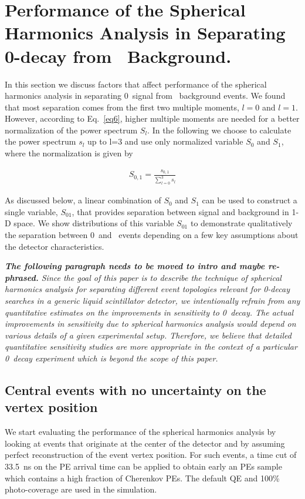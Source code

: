 \section{Performance of the Spherical Harmonics Analysis in Separating 0\nbb-decay from \B~Background.}
\label{sec:performance}

In this section we discuss factors that affect performance of the spherical harmonics analysis in separating
0\nbb~signal from \B~background events. We found that most separation comes from the first two multiple moments,
$l=0$ and $l=1$. However, according to Eq.~\ref{eq6}, higher multiple moments are needed for a better normalization of the 
power spectrum $S_l$. In the following we choose to calculate the power spectrum $s_l$ up to l=3 and
use only normalized variable $S_0$ and $S_1$, where the normalization is given by

\begin{eqnarray}
\label{eq7}
S_{0,1} = \frac{s_{0,1}}{\sum_{l=0}^{3} s_l}
\end{eqnarray}

As discussed below, a linear combination of $S_0$ and $S_1$ can be used to construct a single variable, $S_{01}$, that provides 
separation between signal and background in 1-D space. We show distributions of this variable $S_{01}$ to demonstrate qualitatively 
the separation between 0\nbb~and \B~events depending on a few key assumptions about the detector characteristics.

{\it {\bf The following paragraph needs to be moved to intro and maybe re-phrased. }
Since the goal of this paper is to describe the technique of spherical harmonics analysis for separating
different event topologies relevant for 0\nbb-decay searches in a generic liquid scintillator detector, we intentionally refrain from any 
quantitative estimates on the improvements in sensitivity to 0\nbb~decay. The actual improvements in sensitivity due to spherical 
harmonics analysis would depend on various details of a given experimental setup. Therefore, we believe that detailed quantitative 
sensitivity studies are more appropriate in the context of a particular 0\nbb~decay experiment which is beyond the scope of this paper.
}

\subsection{Central events with no uncertainty on the vertex position}

We start evaluating the performance of the spherical harmonics analysis by looking at events that originate at the center
of the detector and by assuming perfect reconstruction of the event vertex position. For such events, a time cut of 33.5~ns on 
the PE arrival time can be applied to obtain early an PEs sample which contains a high fraction of Cherenkov PEs. The default QE and 100\% 
photo-coverage are used in the simulation.

